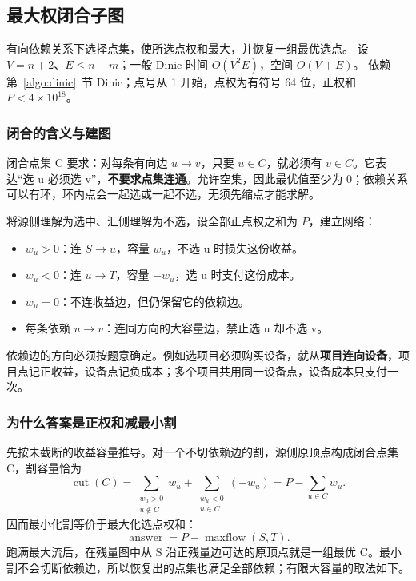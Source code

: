 \subsection{最大权闭合子图}
\label{algo:max-closure}
\AlgorithmInfo
    {有向依赖关系下选择点集，使所选点权和最大，并恢复一组最优选点。}
    {设 $V=n+2$、$E\le n+m$；一般 Dinic 时间 $O(V^2E)$，空间 $O(V+E)$。}
    {依赖第~\ref{algo:dinic}~节 Dinic；点号从 1 开始，点权为有符号 64 位，正权和 $P<4\times10^{18}$。}

\subsubsection*{闭合的含义与建图}
闭合点集 C 要求：对每条有向边 $u\to v$，只要 $u\in C$，就必须有 $v\in C$。它表达“选 u 必须选 v”，\textbf{不要求点集连通}。允许空集，因此最优值至少为 0；依赖关系可以有环，环内点会一起选或一起不选，无须先缩点才能求解。

将源侧理解为选中、汇侧理解为不选，设全部正点权之和为 $P$，建立网络：
\begin{itemize}
    \item $w_u>0$：连 $S\to u$，容量 $w_u$，不选 u 时损失这份收益。
    \item $w_u<0$：连 $u\to T$，容量 $-w_u$，选 u 时支付这份成本。
    \item $w_u=0$：不连收益边，但仍保留它的依赖边。
    \item 每条依赖 $u\to v$：连同方向的大容量边，禁止选 u 却不选 v。
\end{itemize}
依赖边的方向必须按题意确定。例如选项目必须购买设备，就从\textbf{项目连向设备}，项目点记正收益，设备点记负成本；多个项目共用同一设备点，设备成本只支付一次。

\subsubsection*{为什么答案是正权和减最小割}
先按未截断的收益容量推导。对一个不切依赖边的割，源侧原顶点构成闭合点集 C，割容量恰为
\[
 \operatorname{cut}(C)=\sum_{\substack{w_u>0\\u\notin C}}w_u+
 \sum_{\substack{w_u<0\\u\in C}}(-w_u)
 =P-\sum_{u\in C}w_u.
\]
因而最小化割等价于最大化选点权和：
\[
 \boxed{\operatorname{answer}=P-\operatorname{maxflow}(S,T).}
\]
跑满最大流后，在残量图中从 S 沿正残量边可达的原顶点就是一组最优 C。最小割不会切断依赖边，所以恢复出的点集也满足全部依赖；有限大容量的取法如下。

